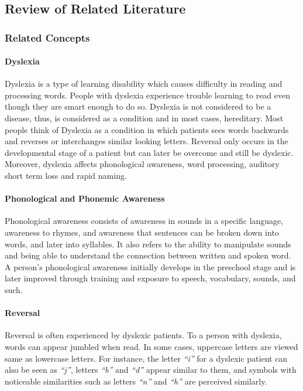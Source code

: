 \documentclass[letterpaper, 12pt, oneside]{book}
\begin{document}
\chapter{}
\section{Review of Related Literature}
\subsection{Related Concepts}
\subsubsection{Dyslexia}
Dyslexia is a type of learning disability which causes difficulty in reading and processing words. People with dyslexia experience trouble learning to read even though they are smart enough to do so. Dyslexia is not considered to be a disease, thus, is considered as a condition and in most cases, hereditary. Most people think of Dyslexia as a condition in which patients sees words backwards and reverses or interchanges similar looking letters. Reversal only occurs in the developmental stage of a patient but can later be overcome and still be dyslexic. Moreover, dyslexia affects phonological awareness, word processing, auditory short term loss and rapid naming. 

\subsubsection{Phonological and Phonemic Awareness}
Phonological awareness consists of awareness in sounds in a specific language, awareness to rhymes, and awareness that sentences can be broken down into words, and later into syllables. It also refers to the ability to manipulate sounds and being able to understand the connection between written and spoken word. A person’s phonological awareness initially develops in the preschool stage and is later improved through training and exposure to speech, vocabulary, sounds, and such. 

\subsubsection{Reversal}
Reversal is often experienced by dyslexic patients. To a person with dyslexia, words can appear jumbled when read. In some cases, uppercase letters are viewed same as lowercase letters. For instance, the letter \textit{“i”} for a dyslexic patient can also be seen as \textit{“j”}, letters \textit{“b”} and \textit{“d” }appear similar to them, and symbols with noticeable similarities such as letters \textit{“n”} and \textit{“h”} are perceived similarly. 
\end{document}
